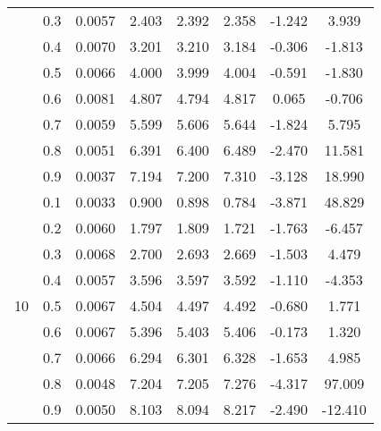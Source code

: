 \documentclass[11pt,a4paper]{report}
\begin{document}
\begin{longtable}{ | c | c || c | c | c | c | c | c | }
 & 0.3 & 0.0057 & 2.403 & 2.392 & 2.358 & -1.242 & 3.939 \\
 & 0.4 & 0.0070 & 3.201 & 3.210 & 3.184 & -0.306 & -1.813 \\
 & 0.5 & 0.0066 & 4.000 & 3.999 & 4.004 & -0.591 & -1.830 \\
 & 0.6 & 0.0081 & 4.807 & 4.794 & 4.817 & 0.065 & -0.706 \\
 & 0.7 & 0.0059 & 5.599 & 5.606 & 5.644 & -1.824 & 5.795 \\
 & 0.8 & 0.0051 & 6.391 & 6.400 & 6.489 & -2.470 & 11.581 \\
 & 0.9 & 0.0037 & 7.194 & 7.200 & 7.310 & -3.128 & 18.990 \\
 \hline
\multirow{9}{*}{10} & 0.1 & 0.0033 & 0.900 & 0.898 & 0.784 & -3.871 & 48.829 \\
 & 0.2 & 0.0060 & 1.797 & 1.809 & 1.721 & -1.763 & -6.457 \\
 & 0.3 & 0.0068 & 2.700 & 2.693 & 2.669 & -1.503 & 4.479 \\
 & 0.4 & 0.0057 & 3.596 & 3.597 & 3.592 & -1.110 & -4.353 \\
 & 0.5 & 0.0067 & 4.504 & 4.497 & 4.492 & -0.680 & 1.771 \\
 & 0.6 & 0.0067 & 5.396 & 5.403 & 5.406 & -0.173 & 1.320 \\
 & 0.7 & 0.0066 & 6.294 & 6.301 & 6.328 & -1.653 & 4.985 \\
 & 0.8 & 0.0048 & 7.204 & 7.205 & 7.276 & -4.317 & 97.009 \\
 & 0.9 & 0.0050 & 8.103 & 8.094 & 8.217 & -2.490 & -12.410 \\
 \hline
\hline
\end{longtable}
\end{document}
